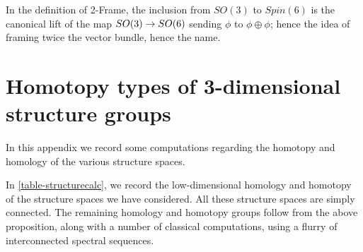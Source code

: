 \documentclass{amsart}
\begin{document}
\nid In the definition of 2-Frame, the inclusion from $SO(3)$ to $Spin(6)$ is the canonical lift of the map $SO(3) \rightarrow SO(6)$ sending $\phi$ to $\phi \oplus \phi$; hence the idea of framing twice the vector bundle, hence the name.  

\section{Homotopy types of 3-dimensional structure groups}



In this appendix we record some computations regarding the homotopy and homology of the various structure spaces.

In \cref{table-structurecalc}, we record the low-dimensional homology and homotopy of the structure spaces we have considered.  All these structure spaces are simply connected.  The remaining homology and homotopy groups follow from the above proposition, along with a number of classical computations, using a flurry of interconnected spectral sequences.  
\end{document}
